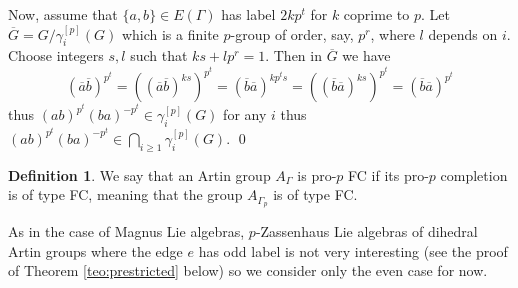 \documentclass[10pt, oneside]{amsart}
\theoremstyle{definition}
\newtheorem{definition}[theorem]{Definition}
\theoremstyle{remark}
\theoremstyle{plain}
\begin{document}
Now, assume that $\{a,b\}\in E(\Gamma)$ has label $2kp^t$ for $k$ coprime to $p$. Let $\overline{G}=G/\gamma^{[p]}_i(G)$ which is a finite $p$-group of order, say, $p^r$, where $l$ depends on $i$. Choose integers $s,l$ such that $ks+lp^r=1$. Then in $\overline{G}$ we have
$$(\overline{a}\overline{b})^{p^t}=((\overline{a}\overline{b})^{ks})^{p^t}=(\overline{b}\overline{a})^{kp^ts}=((\overline{b}\overline{a})^{ks})^{p^t}=(\overline{b}\overline{a})^{p^t}$$
thus $(ab)^{p^t}(ba)^{-p^t}\in\gamma_i^{[p]}(G)$ for any $i$ thus $(ab)^{p^t}(ba)^{-p^t}\in  \bigcap_{i\geq 1}\gamma_i^{[p]}(G)$.
\qed

\begin{definition}
    We say that an Artin group $A_\Gamma$ is pro-$p$ FC if its  pro-$p$ completion is of type FC, meaning that the group $A_{\Gamma_p}$ is of type FC.
\end{definition}




As in the case of Magnus Lie algebras, $p$-Zassenhaus Lie algebras of dihedral Artin groups where the edge $e$ has odd label is not very interesting (see the proof of Theorem \ref{teo:prestricted} below) so we consider only the even case for now.
\end{document}
